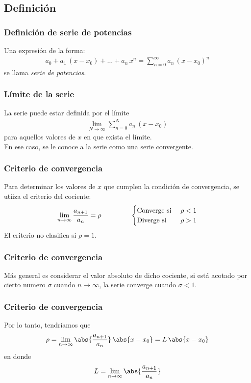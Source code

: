 \subsection{Definición}
\begin{frame}
\frametitle{Definición de serie de potencias}
Una expresión de la forma:
\begin{align}
a_{0} + a_{1} \, (x - x_{0}) + \ldots + a_{n} \, x^{n} = \sum_{n=0}^{\infty} a_{n} \, (x - x_{0})^{n}
\label{eq:ecuacion_01}    
\end{align}
se llama \textit{serie de potencias}.
\end{frame}
\begin{frame}
\frametitle{Límite de la serie}
La serie puede estar definida por el límite
\begin{align*}
\lim_{N \to \infty} \sum_{n=0}^{N} a_{n} \, (x - x_{0})
\end{align*}
para aquellos valores de $x$ en que exista el límite.
\\
\bigskip
En ese caso, se le conoce a la serie como una serie convergente.
\end{frame}
\begin{frame}
\frametitle{Criterio de convergencia}
Para determinar los valores de $x$ que cumplen la condición de convergencia, se utiiza el criterio del cociente:
\begin{align*}
\lim_{n \to \infty} \dfrac{a_{n+1}}{a_{n}} = \rho \hspace{1.5cm} \begin{cases}
\mbox{Converge si } & \rho < 1 \\
\mbox{Diverge si } & \rho > 1
\end{cases}
\end{align*}
El criterio no clasifica si $\rho = 1$.
\end{frame}
\begin{frame}
\frametitle{Criterio de convergencia}
Más general es considerar el valor absoluto de dicho cociente, si está acotado por cierto numero $\sigma$ cuando $n \to \infty$, la serie converge cuando $\sigma < 1$.
\end{frame}
\begin{frame}
\frametitle{Criterio de convergencia}
Por lo tanto, tendríamos que
\begin{align*}
\rho = \lim_{n \to \infty} \abs{\dfrac{a_{n+1}}{a_{n}}} \, \abs{x - x_{0}} = L \, \abs{x - x_{0}}
\end{align*}
en donde
\begin{align*}
L = \lim_{n \to \infty} \abs{\dfrac{a_{n+1}}{a_{n}}}
\end{align*}
\end{frame}
